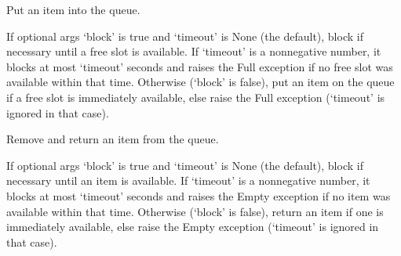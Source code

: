 \documentclass[letterpaper,10pt,english]{sphinxmanual}
\begin{document}
\begin{fulllineitems}
\begin{fulllineitems}
\end{fulllineitems}


\begin{fulllineitems}
\label{\detokenize{queue:queue.Queue.put}}
\pysigstartsignatures
{}
\pysigstopsignatures
\sphinxAtStartPar
Put an item into the queue.

\sphinxAtStartPar
If optional args ‘block’ is true and ‘timeout’ is None (the default),
block if necessary until a free slot is available. If ‘timeout’ is
a non\sphinxhyphen{}negative number, it blocks at most ‘timeout’ seconds and raises
the Full exception if no free slot was available within that time.
Otherwise (‘block’ is false), put an item on the queue if a free slot
is immediately available, else raise the Full exception (‘timeout’
is ignored in that case).

\end{fulllineitems}


\begin{fulllineitems}
\label{\detokenize{queue:queue.Queue.get}}
\pysigstartsignatures
{}
\pysigstopsignatures
\sphinxAtStartPar
Remove and return an item from the queue.

\sphinxAtStartPar
If optional args ‘block’ is true and ‘timeout’ is None (the default),
block if necessary until an item is available. If ‘timeout’ is
a non\sphinxhyphen{}negative number, it blocks at most ‘timeout’ seconds and raises
the Empty exception if no item was available within that time.
Otherwise (‘block’ is false), return an item if one is immediately
available, else raise the Empty exception (‘timeout’ is ignored
in that case).

\end{fulllineitems}



\end{fulllineitems}
\end{document}
